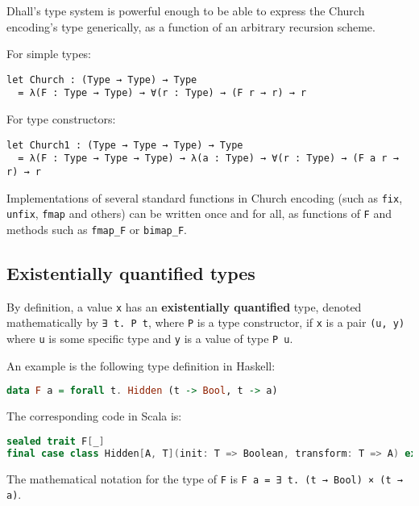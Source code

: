 Dhall's type system is powerful enough to be able to express the Church encoding's type generically, as a function of an arbitrary recursion scheme.


For simple types:


\begin{lstlisting}[language=Dhall]
let Church : (Type → Type) → Type
  = λ(F : Type → Type) → ∀(r : Type) → (F r → r) → r
\end{lstlisting}


For type constructors:


\begin{lstlisting}[language=Dhall]
let Church1 : (Type → Type → Type) → Type
  = λ(F : Type → Type → Type) → λ(a : Type) → ∀(r : Type) → (F a r → r) → r
\end{lstlisting}


Implementations of several standard functions in Church encoding (such as \lstinline!fix!, \lstinline!unfix!, \lstinline!fmap! and others) can be written once and for all, as functions of \lstinline!F! and methods such as \lstinline!fmap_F! or \lstinline!bimap_F!.


\subsection{Existentially quantified types}


By definition, a value \lstinline!x! has an \textbf{existentially quantified} type, denoted mathematically by \lstinline!∃ t. P t!, where \lstinline!P! is a type constructor, if \lstinline!x! is a pair \lstinline!(u, y)! where \lstinline!u! is some specific type and \lstinline!y! is a value of type \lstinline!P u!.


An example is the following type definition in Haskell:


\begin{lstlisting}[language=Haskell]
data F a = forall t. Hidden (t -> Bool, t -> a)
\end{lstlisting}


The corresponding code in Scala is:


\begin{lstlisting}[language=Scala]
sealed trait F[_]
final case class Hidden[A, T](init: T => Boolean, transform: T => A) extends F[A]
\end{lstlisting}


The mathematical notation for the type of \lstinline!F! is \lstinline!F a = ∃ t. (t → Bool) × (t → a)!.


